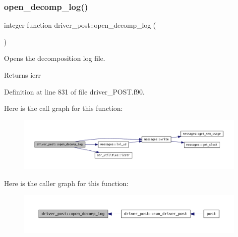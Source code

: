 \mbox{\label{namespacedriver__post_a5d76f87f131e21b4d74fd5f4a7bbbd6b}} 
\subsubsection{\texorpdfstring{open\+\_\+decomp\+\_\+log()}{open\_decomp\_log()}}
{\footnotesize\ttfamily integer function driver\+\_\+post\+::open\+\_\+decomp\+\_\+log (\begin{DoxyParamCaption}{ }\end{DoxyParamCaption})}



Opens the decomposition log file. 

\begin{DoxyReturn}{Returns}
ierr 
\end{DoxyReturn}


Definition at line 831 of file driver\+\_\+\+P\+O\+S\+T.\+f90.

Here is the call graph for this function\+:\nopagebreak
\begin{figure}[H]
\begin{center}
\leavevmode
\includegraphics[width=350pt]{namespacedriver__post_a5d76f87f131e21b4d74fd5f4a7bbbd6b_cgraph}
\end{center}
\end{figure}
Here is the caller graph for this function\+:\nopagebreak
\begin{figure}[H]
\begin{center}
\leavevmode
\includegraphics[width=350pt]{namespacedriver__post_a5d76f87f131e21b4d74fd5f4a7bbbd6b_icgraph}
\end{center}
\end{figure}
\mbox{\label{namespacedriver__post_af9ce961d2d6825b767a93fdbe8806a1c}} 
